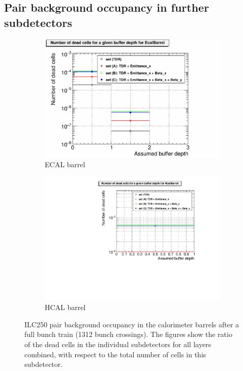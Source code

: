  \clearpage
 \subsection{Pair background occupancy in further \sid subdetectors}

\begin{figure}[!htbp]
 \centering
  \begin{subfigure}[b]{0.49\textwidth}
   \centering
    \includegraphics[width=\textwidth]{Figures/Pairs/Appendix/Occupancy_Comparison_All_layers_deadcells_ILC250_ALL_SETS_ECALBarrel.pdf}
   \caption{\sid ECAL barrel}
   \end{subfigure}
   \hfill
     \begin{subfigure}[b]{0.49\textwidth}
   \centering
    \includegraphics[width=\textwidth]
    {Figures/Pairs/Appendix/Occupancy_Comparison_All_layers_deadcells_ILC250_ALL_SETS_HcalBarrel.pdf}
   \caption{\sid HCAL barrel}
   \end{subfigure}
   \caption[Pair background occupancy in the \sid calorimater barrels for the ILC250]{ILC250 pair background occupancy in the \sid calorimeter barrels after a full bunch train (1312 bunch crossings).
   The figures show the ratio of the dead cells in the individual subdetectors for all layers combined, with respect to the total number of cells in this subdetector.
   }
   \label{fig:PairBkg:ILC250_Occupancy_Further_detectors}
\end{figure}

